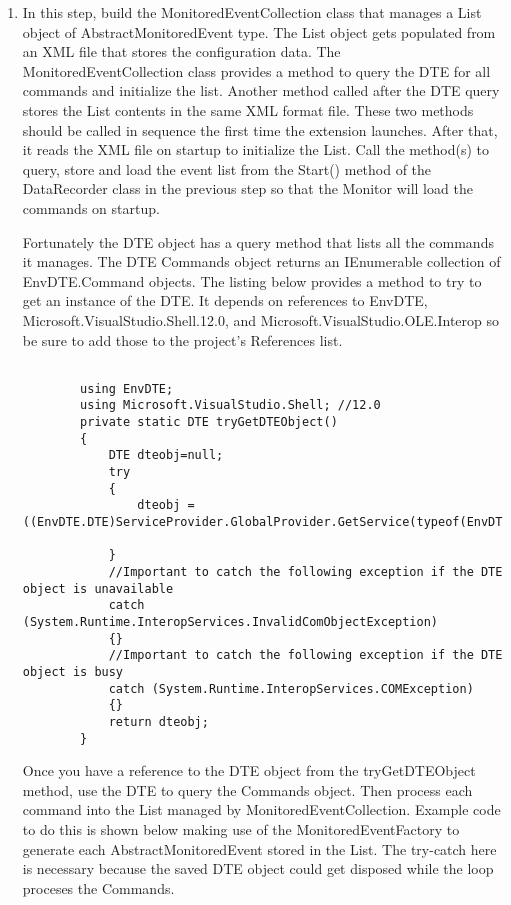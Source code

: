 \begin{enumerate}
\item
In this step, build the MonitoredEventCollection class that manages a List object of AbstractMonitoredEvent type.  The List object gets populated from an XML file that stores the configuration data.  The MonitoredEventCollection class provides a method to query the DTE for all commands and initialize the list.  Another method called after the DTE query stores the List contents in the same XML format file.  These two methods should be called in sequence the first time the extension launches. After that, it  reads the XML file on startup to initialize the List.  Call the method(s) to query, store and load the event list from the Start() method of the DataRecorder class in the previous step so that the Monitor will load the commands on startup.

Fortunately the DTE object has a query method that lists all the commands it manages.   The DTE Commands object returns an IEnumerable collection of EnvDTE.Command objects. The listing below provides a method to try to get an instance of the DTE.  It depends on references to EnvDTE, Microsoft.VisualStudio.Shell.12.0, and Microsoft.VisualStudio.OLE.Interop so be sure to add those to the project's References list.

\begin{lstlisting}

		using EnvDTE;
		using Microsoft.VisualStudio.Shell; //12.0
		private static DTE tryGetDTEObject()
		{
			DTE dteobj=null;
			try
			{
				dteobj = ((EnvDTE.DTE)ServiceProvider.GlobalProvider.GetService(typeof(EnvDTE.DTE).GUID)).DTE;

			}
			//Important to catch the following exception if the DTE object is unavailable
			catch (System.Runtime.InteropServices.InvalidComObjectException)
			{} 
			//Important to catch the following exception if the DTE object is busy
			catch (System.Runtime.InteropServices.COMException)
			{}
			return dteobj;
		}

\end{lstlisting}

Once you have a reference to the DTE object from the tryGetDTEObject method, use the DTE to query the Commands  object.  Then process each command into the List managed by MonitoredEventCollection.  Example code to do this is shown below making use of the MonitoredEventFactory to generate each AbstractMonitoredEvent stored in the List.  The try-catch here is necessary because the saved DTE object could get disposed while the loop proceses the Commands.


\end{enumerate}
